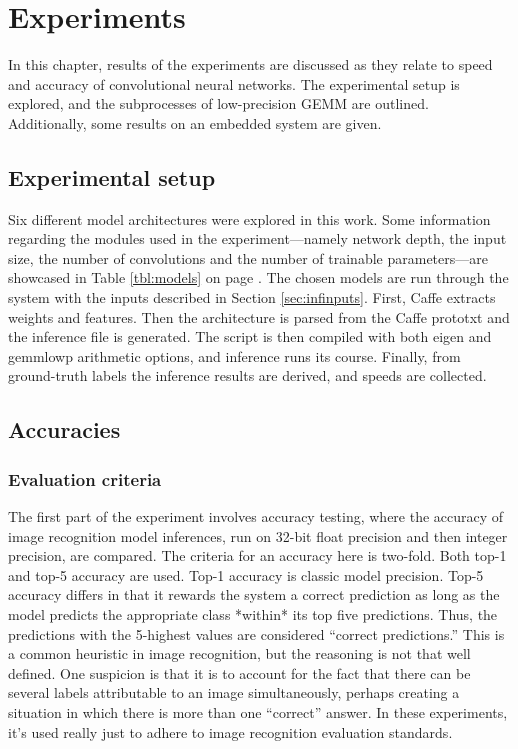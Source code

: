 \chapter{Experiments}
In this chapter, results of the experiments are discussed as they relate to speed and accuracy of convolutional neural networks. The experimental setup is explored, and the subprocesses of low-precision GEMM are outlined. Additionally, some results on an embedded system are given.

\section{Experimental setup}
Six different model architectures were explored in this work. Some information regarding the modules used in the experiment---namely network depth, the input size, the number of convolutions and the number of trainable parameters---are showcased in Table \ref{tbl:models} on page \pageref{tbl:models}. The chosen models are run through the system with the inputs described in Section \ref{sec:infinputs}. First, Caffe extracts weights and features. Then the architecture is parsed from the Caffe prototxt and the inference file is generated. The script is then compiled with both eigen and gemmlowp arithmetic options, and inference runs its course. Finally, from ground-truth labels the inference results are derived, and speeds are collected.

\section{Accuracies}
\subsection{Evaluation criteria}
The first part of the experiment involves accuracy testing, where the accuracy of image recognition model inferences, run on 32-bit float precision and then integer precision, are compared. The criteria for an accuracy here is two-fold. Both top-1 and top-5 accuracy are used. Top-1 accuracy is classic model precision. Top-5 accuracy differs in that it rewards the system a correct prediction as long as the model predicts the appropriate class *within* its top five predictions. Thus, the predictions with the 5-highest values are considered ``correct predictions.'' This is a common heuristic in image recognition, but the reasoning is not that well defined. One suspicion is that it is to account for the fact that there can be several labels attributable to an image simultaneously, perhaps creating a situation in which there is more than one ``correct'' answer. In these experiments, it's used really just to adhere to image recognition evaluation standards.

